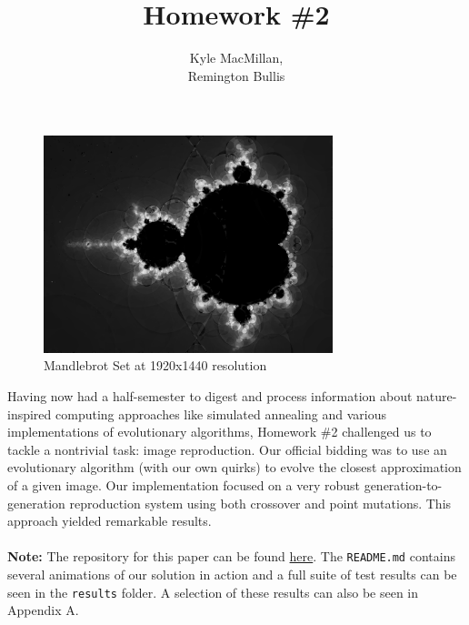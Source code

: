 \documentclass[12pt]{article}
\title{Homework \#2}
\author{Kyle MacMillan, \\Remington Bullis}
\begin{document}
\maketitle

\begin{figure}[H]
\centering
\noindent\includegraphics[width=0.75\textwidth]{../results/mandlebrot/mandlebrot_raw_4000}
\caption{Mandlebrot Set at 1920x1440 resolution}
\label{fig:mandlebrot_raw}
\end{figure}

Having now had a half-semester to digest and process information about nature-inspired computing approaches like simulated annealing and various implementations of evolutionary algorithms, Homework \#2 challenged us to tackle a nontrivial task: image reproduction. Our official bidding was to use an evolutionary algorithm (with our own quirks)  to evolve the closest approximation of a given image. Our implementation focused on a very robust generation-to-generation reproduction system using both crossover and point mutations. This approach yielded remarkable results. 
\\ \\
\textbf{Note: }The repository for this paper can be found \href{https://github.com/macattackftw/ncGA}{here}. 
The \verb|README.md| contains several animations of our solution in action and a full suite of test results can be seen in the \verb|results| folder. A selection of these results can also be seen in Appendix A. 


\newpage
\end{document}
